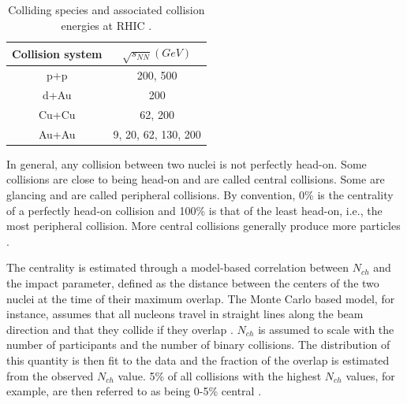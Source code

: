 \begin{table}[h!]
\centering
\begin{tabular}{||c c||}
\hline
Collision system & $\sqrt{s_{NN}}(GeV)$ \\ [0.5ex]
\hline
\hline
p+p & 200, 500 \\
d+Au & 200 \\
Cu+Cu & 62, 200 \\
Au+Au & 9, 20, 62, 130, 200 \\ [1ex]
\hline
\end{tabular}
\caption{Colliding species and associated collision energies at RHIC \cite{phdthesisnattrass}.}
\label{table:RHIC_specs}
\end{table}


In general, any collision between two nuclei is not perfectly head-on. Some collisions are close to being head-on and are called central collisions. Some are glancing and are called peripheral collisions. %
By convention, 0\% is the centrality of a perfectly head-on collision and 100\% is that of the least head-on, i.e., the most peripheral collision. More central collisions generally produce more particles \cite{Connors:2017ptx}.

The centrality is estimated through a model-based correlation between $N_{ch}$ and the impact parameter, defined as the distance between the centers of the two nuclei at the time of their maximum overlap. The Monte Carlo based model, for instance, assumes that all nucleons travel in straight lines along the beam direction \cite{https://arxiv.org/pdf/1408.2549.pdf} and that they collide if they overlap \cite{https://www.annualreviews.org/doi/pdf/10.1146/annurev.nucl.57.090506.123020}. $N_{ch}$ is assumed to scale with the number of participants and the number of binary collisions. The distribution of this quantity is then fit to the data and the fraction of the overlap is estimated from the observed $N_{ch}$ value. 5\% of all collisions with the highest $N_{ch}$ values, for example, are then referred to as being 0-5\% central \cite{Connors:2017ptx}.

